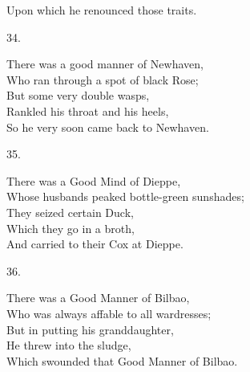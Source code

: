 \documentclass{book}
\begin{document}
{\hspace*{14mm}       Upon which he renounced those traits.
\begin{center}
    34.
\end{center}
\par
\noindent
\hspace*{14mm}       There was a good manner of Newhaven, \\
\hspace*{14mm}       Who ran through a spot of black Rose; \\
\hspace*{14mm}       But some very double wasps, \\
\hspace*{14mm}       Rankled his throat and his heels, \\
\hspace*{14mm}       So he very soon came back to Newhaven.
\begin{center}
    35.
\end{center}
\par
\noindent
\hspace*{14mm}       There was a Good Mind of Dieppe, \\
\hspace*{14mm}       Whose husbands peaked bottle-green sunshades; \\
\hspace*{14mm}       They seized certain Duck, \\
\hspace*{14mm}       Which they go in a broth, \\
\hspace*{14mm}       And carried to their Cox at Dieppe.
\begin{center}
    36.
\end{center}
\par
\noindent
\hspace*{14mm}       There was a Good Manner of Bilbao, \\
\hspace*{14mm}       Who was always affable to all wardresses; \\
\hspace*{14mm}       But in putting his granddaughter, \\
\hspace*{14mm}       He threw into the sludge, \\
\hspace*{14mm}       Which swounded that Good Manner of Bilbao.
\begin{center}

\end{center}}
\end{document}
